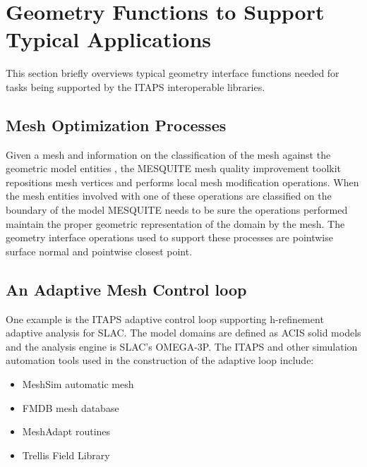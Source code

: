 \documentclass{article}
\begin{document}
\section{Geometry Functions to Support Typical Applications}
This section briefly overviews typical geometry interface 
functions needed for tasks being supported by the ITAPS interoperable 
libraries.


\subsection{Mesh Optimization Processes}

Given a mesh and information on the classification of the 
mesh against the geometric model entities \cite{r2, r22}, the MESQUITE 
mesh quality improvement toolkit \cite{r7, r15} repositions mesh vertices 
and performs local mesh modification operations. When the mesh 
entities involved with one of these operations are classified 
on the boundary of the model MESQUITE needs to be sure the operations 
performed maintain the proper geometric representation of the 
domain by the mesh. The geometry interface operations used to 
support these processes are pointwise surface normal and pointwise 
closest point.


\subsection{An Adaptive Mesh Control loop }

One example is the ITAPS adaptive control loop supporting 
h-refinement adaptive analysis for SLAC. The model domains are 
defined as ACIS solid models and the analysis engine is SLAC's 
OMEGA-3P. The ITAPS and other simulation automation tools used 
in the construction of the adaptive loop include:

\begin{itemize}
\item MeshSim automatic mesh \cite{r24}
\item FMDB mesh database \cite{r1, r20}
\item MeshAdapt routines \cite{r13}
\item Trellis Field Library  \cite{r4}
\end{itemize}
\end{document}
